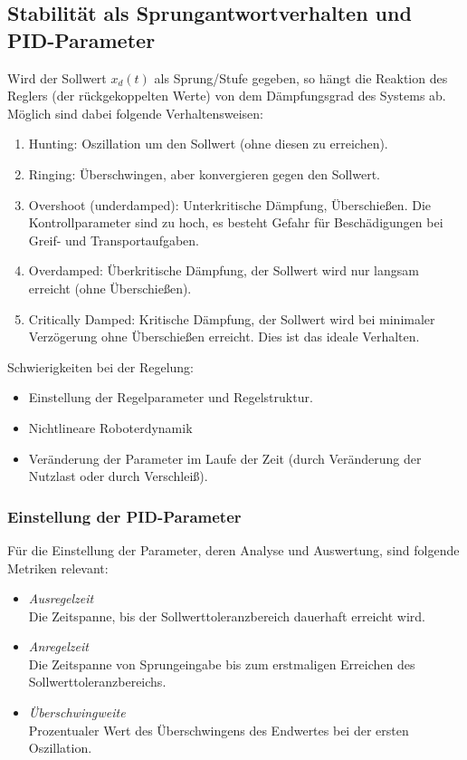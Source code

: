		\subsection{Stabilität als Sprungantwortverhalten und PID-Parameter}
			Wird der Sollwert \( x_d(t) \) als Sprung/Stufe gegeben, so hängt die Reaktion des Reglers (\bzw der rückgekoppelten Werte) von dem Dämpfungsgrad des Systems ab. Möglich sind dabei folgende Verhaltensweisen:
			\begin{enumerate}
				\item Hunting: Oszillation um den Sollwert (ohne diesen zu erreichen).
				\item Ringing: Überschwingen, aber konvergieren gegen den Sollwert.
				\item Overshoot (underdamped): Unterkritische Dämpfung, Überschießen. Die Kontrollparameter sind zu hoch, es besteht Gefahr für Beschädigungen bei Greif- und Transportaufgaben.
				\item Overdamped: Überkritische Dämpfung, der Sollwert wird nur langsam erreicht (ohne Überschießen).
				\item Critically Damped: Kritische Dämpfung, der Sollwert wird bei minimaler Verzögerung ohne Überschießen erreicht. Dies ist das ideale Verhalten.
			\end{enumerate}

			Schwierigkeiten bei der Regelung:
			\begin{itemize}
				\item Einstellung der Regelparameter und Regelstruktur.
				\item Nichtlineare Roboterdynamik
				\item Veränderung der Parameter im Laufe der Zeit (\zB durch Veränderung der Nutzlast oder durch Verschleiß).
			\end{itemize}

			\subsubsection{Einstellung der PID-Parameter}
				Für die Einstellung der Parameter, \bzw deren Analyse und Auswertung, sind folgende Metriken relevant:
				\begin{itemize}
					\item \emph{Ausregelzeit} \\ Die Zeitspanne, bis der Sollwerttoleranzbereich dauerhaft erreicht wird.
					\item \emph{Anregelzeit} \\ Die Zeitspanne von Sprungeingabe bis zum erstmaligen Erreichen des Sollwerttoleranzbereichs.
					\item \emph{Überschwingweite} \\ Prozentualer Wert des Überschwingens des Endwertes bei der ersten Oszillation.
				\end{itemize}

